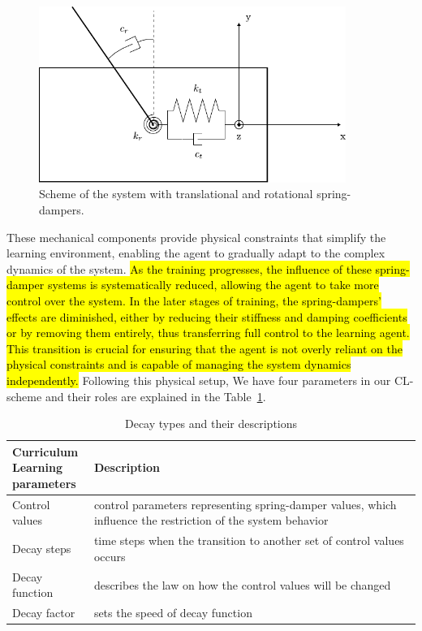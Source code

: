 \begin{figure}[h]
	\centering
	\includegraphics[width=10cm]{Figures/cl_mech_implementation_v1.pdf}
	\caption{Scheme of the system with translational and rotational spring-dampers. }
	\label{fig: cl mechanical implementation}
\end{figure}

These mechanical components provide physical constraints that simplify the learning environment, enabling the agent to gradually adapt to the complex dynamics of the system. \hl{As the training progresses, the influence of these spring-damper systems is systematically reduced, allowing the agent to take more control over the system. In the later stages of training, the spring-dampers' effects are diminished, either by reducing their stiffness and damping coefficients or by removing them entirely, thus transferring full control to the learning agent. This transition is crucial for ensuring that the agent is not overly reliant on the physical constraints and is capable of managing the system dynamics independently.}
Following this physical setup, We have four parameters in our CL-scheme and their roles are explained in the Table~\ref{table: decay types}. 

\begin{table}[h]
	\caption{Decay types and their descriptions}
	\centering
	\begin{tabular}{l|p{}}
		\toprule
		\makecell{\textbf{Curriculum}\\ \textbf{Learning}\\ \textbf{parameters}} & \textbf{Description} \\ \midrule
		Control values & control parameters representing spring-damper values, which influence the restriction of the system behavior\\ \hline 
		Decay steps & time steps when the transition to another set of control values occurs\\ \hline 
		Decay function & describes the law on how the control values will be changed\\ \hline
		Decay factor & sets the speed of decay function\\ 
		\bottomrule
	\end{tabular}
	\label{table: decay types}
\end{table}

